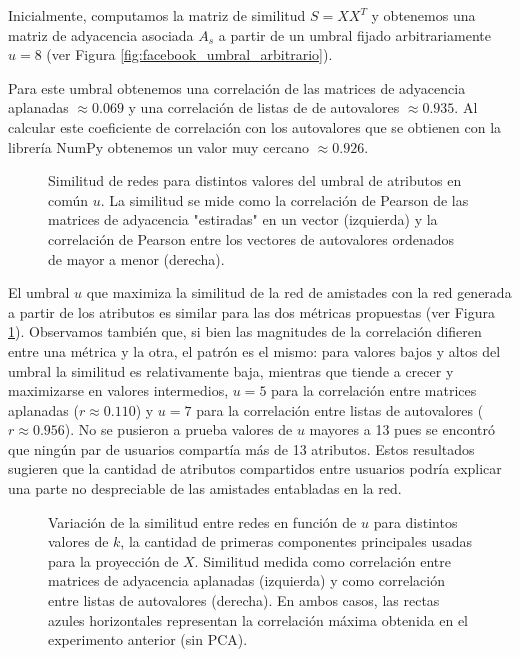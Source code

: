 \documentclass{article}
\begin{document}
Inicialmente, computamos la matriz de similitud $S = XX^T$ y obtenemos una matriz de adyacencia asociada $A_s$ a partir de un umbral fijado arbitrariamente $u=8$ (ver Figura \ref{fig:facebook_umbral_arbitrario}).  

Para este umbral obtenemos una correlación de las matrices de adyacencia aplanadas $\approx 0.069$ y una correlación de listas de de autovalores $\approx 0.935$. Al calcular este coeficiente de correlación con los autovalores que se obtienen con la librería NumPy obtenemos un valor muy cercano $\approx 0.926$.

\begin{figure}[!ht]
    \centering
    
    
    \caption{
        Similitud de redes para distintos valores del umbral de atributos en común $u$. La similitud se mide como la correlación de Pearson de las matrices de adyacencia "estiradas" en un vector (izquierda) y la correlación de Pearson entre los vectores de autovalores ordenados de mayor a menor (derecha).   
    } 
    \label{fig:facebook_umbrales}
\end{figure}



El umbral $u$ que maximiza la similitud de la red de amistades con la red generada a partir de los atributos es similar para las dos métricas propuestas (ver Figura \ref{fig:facebook_umbrales}). Observamos también que, si bien las magnitudes de la correlación difieren entre una métrica y la otra, el patrón es el mismo: para valores bajos y altos del umbral la similitud es relativamente baja, mientras que tiende a crecer y maximizarse en valores intermedios, $u = 5$ para la correlación entre matrices aplanadas ($r \approx 0.110$) y $u = 7$ para la correlación entre listas de autovalores ($r \approx 0.956$). No se pusieron a prueba valores de $u$ mayores a 13 pues se encontró que ningún par de usuarios compartía más de 13 atributos. Estos resultados sugieren que la cantidad de atributos compartidos entre usuarios podría explicar una parte no despreciable de las amistades entabladas en la red. 

\begin{figure}[!ht]
    \centering
    
    
    \caption{
        Variación de la similitud entre redes en función de $u$ para distintos valores de $k$, la cantidad de primeras componentes principales usadas para la proyección de $X$. Similitud medida como correlación entre matrices de adyacencia aplanadas (izquierda) y como correlación entre listas de autovalores (derecha). En ambos casos, las rectas azules horizontales representan la correlación máxima obtenida en el experimento anterior (sin PCA).
    } 
    \label{fig:facebook_pca}
\end{figure}
\end{document}
